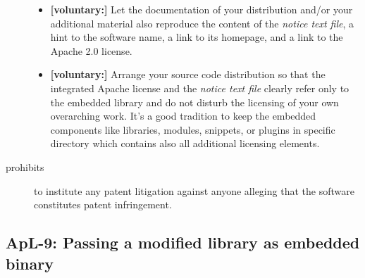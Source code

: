 \begin{description}
\begin{itemize}
  \item \textbf{[voluntary:]} Let the documentation of your distribution and/or
  your additional material also reproduce the content of the \emph{notice text
  file}, a hint to the software name, a link to its homepage, and a link to the
  Apache 2.0 license.

  \item \textbf{[voluntary:]} Arrange your source code distribution so that the
  integrated Apache license and the \emph{notice text file} clearly refer only
  to the embedded library and do not disturb the licensing of your own
  overarching work. It's a good tradition to keep the embedded components like
  libraries, modules, snippets, or plugins in specific directory which contains
  also all additional licensing elements.
 
\end{itemize}

\item[prohibits] to institute any patent litigation against anyone alleging that
the software constitutes patent infringement.

\end{description}


\subsection{ApL-9: Passing a modified library as embedded binary}

